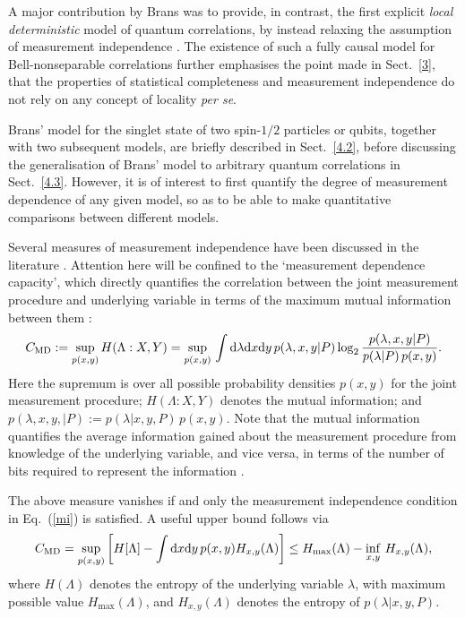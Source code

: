 \documentclass[graybox]{svmult}
\begin{document}
A major contribution by Brans was to provide, in contrast, the first explicit {\it local deterministic} model of quantum correlations, by instead relaxing the assumption of measurement independence \cite{brans}. The existence of such a fully causal model for Bell-nonseparable correlations further emphasises the point made in Sect.~\ref{3}, that the properties of statistical completeness and measurement independence do not rely on any concept of locality {\it per se}. 

Brans' model for the singlet state of two spin-$1/2$ 
particles or qubits, together with two subsequent models, are briefly described in Sect.~\ref{4.2}, before discussing the generalisation of Brans' model to arbitrary quantum correlations in Sect.~\ref{4.3}.  
However, it is of interest to first quantify the degree of measurement dependence of any given model, so as to be able to make quantitative comparisons between different models.

Several measures of measurement independence have been discussed in the literature \cite{hallmodel,bg,relaxed,banik,koh,scarani,kay,gisinbell}.  Attention here will be confined to the `measurement dependence capacity',
which directly quantifies the correlation between the joint measurement procedure and  underlying variable in terms of the maximum mutual information between them \cite{bg}:
\begin{equation} \label{cmd} 
C_{\rm MD} := \sup_{p(x,y)} H(\Lambda:X,Y) = \sup_{p(x,y)}\,\int\D\lambda\D x\D y\,p(\lambda,x,y|P)\log_2\frac{p(\lambda,x,y|P)}{p(\lambda|P)\,p(x,y)} .
\end{equation}
Here the supremum is over all possible probability densities $p(x,y)$ for the joint measurement procedure;  $H(\Lambda:X,Y)$ denotes the mutual information; and $p(\lambda,x,y,|P):=p(\lambda|x,y,P)\,p(x,y)$.  Note that the mutual information quantifies the average information gained about the measurement procedure from knowledge of the underlying variable, and vice versa, in terms of the number of bits required to represent the information \cite{inf}.  

The above measure vanishes if and only the measurement independence condition in Eq.~(\ref{mi}) is satisfied.  A useful upper bound follows via \cite{relaxed}
\begin{equation} \label{cbound}
C_{\rm MD} =\sup_{p(x,y)}\left[ H[\Lambda]-\int \D x\D y\,p(x,y) H_{x,y}(\Lambda)\right]\leq H_{\max} (\Lambda) - \inf_{x,y}\,H_{x,y}(\Lambda),
\end{equation}
where $H(\Lambda)$ denotes the  entropy of the underlying variable $\lambda$, with maximum possible value $H_{\max}(\Lambda)$, and $H_{x,y}(\Lambda)$ denotes the entropy of $p(\lambda|x,y,P)$.	
	
\end{document}
